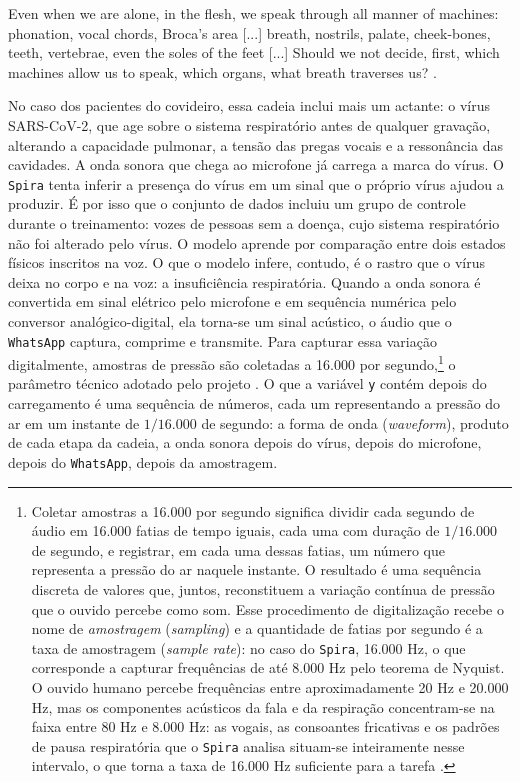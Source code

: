 \begin{citacaoabnt}
Even when we are alone, in the flesh, we speak through all manner of machines: phonation, vocal chords, Broca's area [...] breath, nostrils, palate, cheek-bones, teeth, vertebrae, even the soles of the feet [...] Should we not decide, first, which machines allow us to speak, which organs, what breath traverses us? \parencite{Latour2008Powers}.
\end{citacaoabnt}

No caso dos pacientes do covideiro, essa cadeia inclui mais um actante: o vírus SARS-CoV-2, que age sobre o sistema respiratório antes de qualquer gravação, alterando a capacidade pulmonar, a tensão das pregas vocais e a ressonância das cavidades. A onda sonora que chega ao microfone já carrega a marca do vírus. O \texttt{Spira} tenta inferir a presença do vírus em um sinal que o próprio vírus ajudou a produzir. É por isso que o conjunto de dados incluiu um grupo de controle durante o treinamento: vozes de pessoas sem a doença, cujo sistema respiratório não foi alterado pelo vírus. O modelo aprende por comparação entre dois estados físicos inscritos na voz. O que o modelo infere, contudo, é o rastro que o vírus deixa no corpo e na voz: a insuficiência respiratória. Quando a onda sonora é convertida em sinal elétrico pelo microfone e em sequência numérica pelo conversor analógico-digital, ela torna-se um sinal acústico, o áudio que o \texttt{WhatsApp} captura, comprime e transmite. Para capturar essa variação digitalmente, amostras de pressão são coletadas a 16.000 por segundo,\footnote{Coletar amostras a 16.000 por segundo significa dividir cada segundo de áudio em 16.000 fatias de tempo iguais, cada uma com duração de $1/16.000$ de segundo, e registrar, em cada uma dessas fatias, um número que representa a pressão do ar naquele instante. O resultado é uma sequência discreta de valores que, juntos, reconstituem a variação contínua de pressão que o ouvido percebe como som. Esse procedimento de digitalização recebe o nome de \textit{amostragem} (\textit{sampling}) e a quantidade de fatias por segundo é a taxa de amostragem (\textit{sample rate}): no caso do \texttt{Spira}, 16.000 Hz, o que corresponde a capturar frequências de até 8.000 Hz pelo teorema de Nyquist. O ouvido humano percebe frequências entre aproximadamente 20 Hz e 20.000 Hz, mas os componentes acústicos da fala e da respiração concentram-se na faixa entre 80 Hz e 8.000 Hz: as vogais, as consoantes fricativas e os padrões de pausa respiratória que o \texttt{Spira} analisa situam-se inteiramente nesse intervalo, o que torna a taxa de 16.000 Hz suficiente para a tarefa \parencite{Casanova2021DeepLearning}.} o parâmetro técnico adotado pelo projeto \parencite{Casanova2021DeepLearning}. O que a variável \texttt{y} contém depois do carregamento é uma sequência de números, cada um representando a pressão do ar em um instante de $1/16.000$ de segundo: a forma de onda (\textit{waveform}), produto de cada etapa da cadeia, a onda sonora depois do vírus, depois do microfone, depois do \texttt{WhatsApp}, depois da amostragem.

